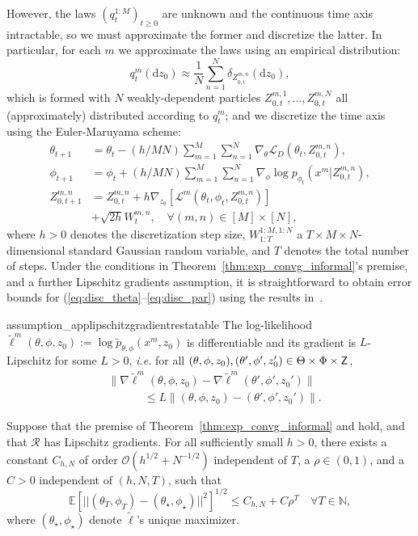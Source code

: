 \documentclass[twoside]{article}
\begin{document}
However, the laws $(q_t^{1:M})_{t\geq0}$ are unknown and the continuous time axis intractable, so we must approximate the former and discretize the latter. In particular, for each $m$ we approximate the laws using an empirical distribution:
$$
q_t^m(\mathrm{d}z_0) \approx \frac{1}{N}\sum_{n=1}^N\delta_{Z_{0,t}^{m,n}}(\mathrm{d}z_0),
$$ 
which is formed with $N$ weakly-dependent particles ${Z_{0,t}^{m,1},\dots,Z_{0,t}^{m,N}}$ all (approximately) distributed according to $q_t^{m}$; and we discretize the time axis using the Euler-Maruyama scheme:
\begin{align}
    {\theta}_{t+1} &= \theta_t - (h/MN) \sum_{m=1}^M \sum_{n=1}^N\nabla_{\theta} \mathcal{L}_D(\theta_t, Z_{0,t}^{m,n}),\label{eq:disc_theta} 
    \\
    {\phi}_{t+1} &= \phi_t + (h/MN)  \sum_{m=1}^M\sum_{n=1}^N \nabla_{\phi} \log p_{\phi_t}( x^m | Z_{0,t}^{m,n}),\label{eq:disc_phi} 
    \\
    Z_{0,t+1}^{m,n} &= Z_{0,t}^{m,n} + h\nabla_{z_{0}} [\mathcal{L}^m(\theta_t, \phi_t, {Z}_{0,t}^{m,n})]\nonumber \\
    &+\sqrt{{2h}} W_{t}^{m,n}, \quad \forall (m,n) \in [M] \times [N],\label{eq:disc_par}
\end{align}
 where $h>0$ denotes the discretization step size, $W_{1:T}^{1:M,1:N}$ a $T\times M\times N$-dimensional standard Gaussian random variable, and $T$ denotes the total number of steps. Under the conditions in Theorem~\ref{thm:exp_convg_informal}'s premise, and a further Lipschitz gradients assumption, it is straightforward to obtain error bounds for (\ref{eq:disc_theta}--\ref{eq:disc_par}) using the results in~\cite{caprioerrorboundsparticle2024}.
\begin{restatable}{assumption_app}{lipschitzgradientrestatable}\label{assump:lipschitz_grad}
The log-likelihood $\tilde\ell^m(\theta, \phi,z_0):=\log \tilde{p}_{\theta,\phi}(x^m,z_0)$ is differentiable and its gradient 
is $L$-Lipschitz for some $L > 0$, \emph{i.e.} for all $(\theta, \phi, z_0), (\theta',\phi', z_0') \in \Theta \times \Phi \times {\mathsf{Z}}$,
\begin{align*}
    &\|\nabla \tilde\ell^m(\theta, \phi, z_0) - \nabla \tilde\ell^m(\theta',\phi', z_0')\| \\
    &\qquad \quad \, \leq L\|(\theta, \phi, z_0) - (\theta', \phi', z_0')\|.
\end{align*}
\end{restatable}
\begin{theorem}\label{thrm:error-bound}
Suppose that the premise of Theorem~\ref{thm:exp_convg_informal} and  hold, and that $\mathcal{R}$ has Lipschitz gradients. For all sufficiently small $h>0$, there exists a constant $C_{h,N}$ of order $\mathcal{O}(h^{1/2}+N^{-1/2})$ independent of $T$, a $\rho \in (0, 1)$, and a $C>0$ independent of $(h,N,T)$, such that
$$\mathbb{E}\left[\vert\vert(\theta_T,\phi_T)-(\theta_\star,\phi_\star) \vert\vert^2\right]^{1/2} \leq C_{h,N}+C\rho^T\quad\forall T\in \mathbb{N},$$
where $(\theta_\star,\phi_\star)$ denote $\tilde{\ell}$'s unique maximizer.
\end{theorem}
\end{document}
